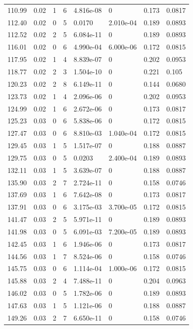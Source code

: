 \documentclass[preview]{standalone}
\begin{document}
{{{\begin{tabular}{L{1.2cm}C{1.2cm} C{0.3cm}C{0.5cm} C{1.4cm}C{1.4cm} C{1.4cm}C{1.4cm}}
  110.99  &  0.02  & 1     &  6 &  4.816e-08  & 0  & 0.173 &  0.0817   \\ 
  112.40  &  0.02  & 0     &  5 &  0.0170  & 2.010e-04  & 0.189 &  0.0893   \\ 
  112.52  &  0.02  & 2     &  5 &  6.084e-11  & 0  & 0.189 &  0.0893   \\ 
  116.01  &  0.02  & 0     &  6 &  4.990e-04  & 6.000e-06  & 0.172 &  0.0815   \\ 
  117.95  &  0.02  & 1     &  4 &  8.839e-07  & 0  & 0.202 &  0.0953   \\ 
  118.77  &  0.02  & 2     &  3 &  1.504e-10  & 0  & 0.221 &  0.105   \\ 
  120.23  &  0.02  & 2     &  8 &  6.149e-11  & 0  & 0.144 &  0.0680   \\ 
  123.73  &  0.02  & 1     &  4 &  2.096e-06  & 0  & 0.202 &  0.0953   \\ 
  124.99  &  0.02  & 1     &  6 &  2.672e-06  & 0  & 0.173 &  0.0817   \\ 
  125.23  &  0.03  & 0     &  6 &  5.838e-06  & 0  & 0.172 &  0.0815   \\ 
  127.47  &  0.03  & 0     &  6 &  8.810e-03  & 1.040e-04  & 0.172 &  0.0815   \\ 
  129.45  &  0.03  & 1     &  5 &  1.517e-07  & 0  & 0.188 &  0.0887   \\ 
  129.75  &  0.03  & 0     &  5 &  0.0203  & 2.400e-04  & 0.189 &  0.0893   \\ 
  132.11  &  0.03  & 1     &  5 &  3.639e-07  & 0  & 0.188 &  0.0887   \\ 
  135.90  &  0.03  & 2     &  7 &  2.724e-11  & 0  & 0.158 &  0.0746   \\ 
  137.69  &  0.03  & 1     &  6 &  7.642e-08  & 0  & 0.173 &  0.0817   \\ 
  137.91  &  0.03  & 0     &  6 &  3.175e-03  & 3.700e-05  & 0.172 &  0.0815   \\ 
  141.47  &  0.03  & 2     &  5 &  5.971e-11  & 0  & 0.189 &  0.0893   \\ 
  141.98  &  0.03  & 0     &  5 &  6.091e-03  & 7.200e-05  & 0.189 &  0.0893   \\ 
  142.45  &  0.03  & 1     &  6 &  1.946e-06  & 0  & 0.173 &  0.0817   \\ 
  144.56  &  0.03  & 1     &  7 &  8.524e-06  & 0  & 0.158 &  0.0746   \\ 
  145.75  &  0.03  & 0     &  6 &  1.114e-04  & 1.000e-06  & 0.172 &  0.0815   \\ 
  145.88  &  0.03  & 2     &  4 &  7.488e-11  & 0  & 0.204 &  0.0963   \\ 
  146.02  &  0.03  & 0     &  5 &  1.782e-06  & 0  & 0.189 &  0.0893   \\ 
  147.63  &  0.03  & 1     &  5 &  1.121e-06  & 0  & 0.188 &  0.0887   \\ 
  149.26  &  0.03  & 2     &  7 &  6.650e-11  & 0  & 0.158 &  0.0746   \\ 
\hline 
\end{tabular} 

}}}
\end{document}
